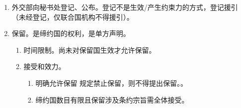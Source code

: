 \begin{enumerate}
\begin{enumerate}
                \begin{kk}{缔结程序}
                  \begin{enumerate}
                    \item 缔结新条约。
                          \begin{enumerate}
                            \item 条约明确规定其生效方式。。
                            \item 没有规定 \yjt 重要类批准，非重要类核准。
                          \end{enumerate}
                    \item 进入老条约。开放性条约才可进入。
                          \begin{enumerate}
                            \item 条约规定。。
                            \item 没有规定 \yjt 高规格加入，低规格接受。
                          \end{enumerate}
                    \item 重要类人常定、批准书主席签；其他国务院定、外交部长签。核准书还可总理签。
                    \item 谁定谁公布。人常定人常公布，国务院定国务院公布。
                  \end{enumerate}
                  \tcblower
                  和好、领界、要批准，引渡、协助、法不同。和平、友好合作、领土、各方议定须经批准；引渡、司法协助、同我国法律有不同规定。
                  。
                \end{kk}
          \item 外交部向秘书处登记、公布。登记不是生效/产生约束力的方式，登记援引（未经登记，仅联合国机构不得援引）。
          \item 保留。是缔约国的权利，是单方声明。
                \begin{enumerate}
                  \item 时间限制。尚未对保留国生效才允许保留。
                  \item 接受和效力。
                        \begin{enumerate}
                          \item 明确允许保留 \yjt 规定禁止保留，则不得提出保留。。
                          \item 缔约国数目有限且保留涉及条约宗旨需全体接受。

\end{enumerate}
\end{enumerate}
\end{enumerate}
\end{enumerate}
